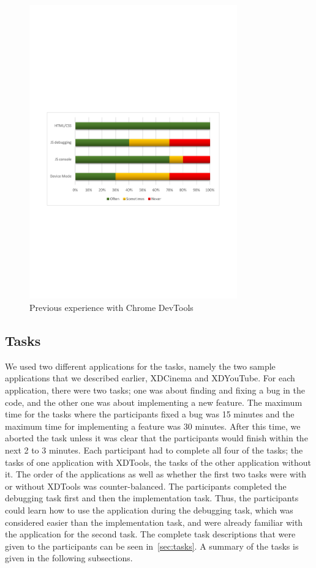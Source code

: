 \begin{figure}[H]
  \centering
    \includegraphics[width=0.8\textwidth]{images/charts/devtools_xp.pdf}
	\caption[Previous experience with Chrome DevTools]{Previous experience with Chrome DevTools}
	\label{fig:devtools_xp}
\end{figure}

\subsection{Tasks}

We used two different applications for the tasks, namely the two sample applications that we described earlier, XDCinema and XDYouTube. For each application, there were two tasks; one was about finding and fixing a bug in the code, and the other one was about implementing a new feature. The maximum time for the tasks where the participants fixed a bug was 15 minutes and the maximum time for implementing a feature was 30 minutes. After this time, we aborted the task unless it was clear that the participants would finish within the next 2 to 3 minutes. Each participant had to complete all four of the tasks; the tasks of one application with XDTools, the tasks of the other application without it. The order of the applications as well as whether the first two tasks were with or without XDTools was counter-balanced. The participants completed the debugging task first and then the implementation task. Thus, the participants could learn how to use the application during the debugging task, which was considered easier than the implementation task, and were already familiar with the application for the second task. The complete task descriptions that were given to the participants can be seen in~\ref{sec:tasks}. A summary of the tasks is given in the following subsections.

